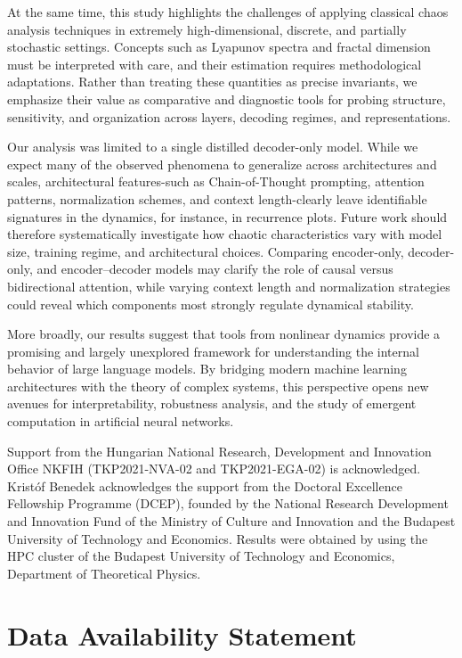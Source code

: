 \documentclass[aip%
 aip,
 amsmath,amssymb,
 reprint,%
]{revtex4-1}
\begin{document}
At the same time, this study highlights the challenges of applying classical chaos analysis techniques in extremely high-dimensional, discrete, and partially stochastic settings. Concepts such as Lyapunov spectra and fractal dimension must be interpreted with care, and their estimation requires methodological adaptations. Rather than treating these quantities as precise invariants, we emphasize their value as comparative and diagnostic tools for probing structure, sensitivity, and organization across layers, decoding regimes, and representations.

Our analysis was limited to a single distilled decoder-only model. While we expect many of the observed phenomena to generalize across architectures and scales, architectural features-such as Chain-of-Thought prompting, attention patterns, normalization schemes, and context length-clearly leave identifiable signatures in the dynamics, for instance, in recurrence plots. Future work should therefore systematically investigate how chaotic characteristics vary with model size, training regime, and architectural choices. Comparing encoder-only, decoder-only, and encoder–decoder models may clarify the role of causal versus bidirectional attention, while varying context length and normalization strategies could reveal which components most strongly regulate dynamical stability.


More broadly, our results suggest that tools from nonlinear dynamics provide a promising and largely unexplored framework for understanding the internal behavior of large language models. By bridging modern machine learning architectures with the theory of complex systems, this perspective opens new avenues for interpretability, robustness analysis, and the study of emergent computation in artificial neural networks.

\begin{acknowledgments}
Support from the Hungarian National Research, Development and Innovation Office NKFIH (TKP2021-NVA-02 and TKP2021-EGA-02) is acknowledged.
Kristóf Benedek acknowledges the support from the Doctoral Excellence Fellowship Programme (DCEP), founded by the National Research Development and Innovation Fund of the Ministry of Culture and Innovation and the Budapest University of Technology and Economics. 
Results were obtained by using the HPC cluster of the Budapest University of Technology and Economics, Department of Theoretical Physics.
\end{acknowledgments}

\section*{Data Availability Statement}
\end{document}
